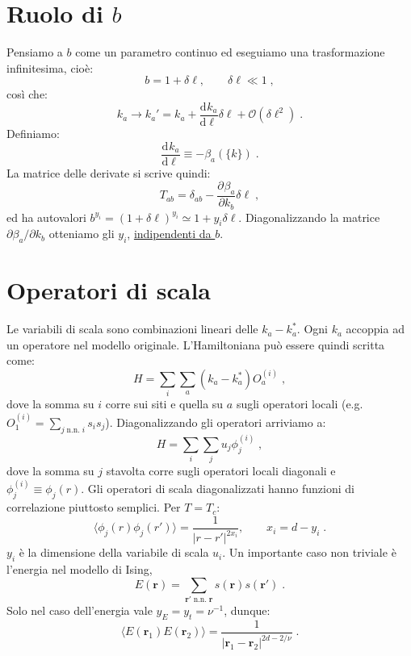 \documentclass[10pt,a4paper]{report}
\theoremstyle{definition}
\newcommand{\pdev}[3][]{\frac{\partial^{#1} #2}{\partial #3^{#1}}}
\newcommand{\dev}[3][]{\frac{\mathrm{d}^{#1} #2}{\mathrm{d} #3^{#1}}}
\numberwithin{equation}{section}
\newcommand{\bra}{\langle}
\newcommand{\ket}{\rangle}
\begin{document}
\section{Ruolo di $b$}
Pensiamo a $b$ come un parametro continuo ed eseguiamo una trasformazione infinitesima, cioè:
$$
b=1+\delta\ell,\qquad \delta\ell\ll 1\;,
$$
così che:
\begin{equation}
k_a\to k_a'=k_a+\dev{k_a}{\ell}\delta\ell+\mathcal{O}(\delta\ell^2)\;.
\end{equation}
Definiamo:
\begin{equation}
\dev{k_a}{\ell}\equiv -\beta_a(\{k\})\;.
\end{equation}
La matrice delle derivate si scrive quindi:
\begin{equation}
T_{ab}=\delta_{ab}-\pdev{\beta_a}{k_b}\delta\ell\;,
\end{equation}
ed ha autovalori $b^{y_i}=(1+\delta\ell)^{y_i}\simeq 1+y_i\delta\ell$. Diagonalizzando la matrice $\partial\beta_a/\partial k_b$ otteniamo gli $y_i$, \underline{indipendenti da $b$}.
\section{Operatori di scala}
Le variabili di scala sono combinazioni lineari delle $k_a-k_a^*$. Ogni $k_a$ accoppia ad un operatore nel modello originale. L'Hamiltoniana può essere quindi scritta come:
\begin{equation}
H=\sum_i\sum_a(k_a-k_a^*)O_a^{(i)}\;,
\end{equation}
dove la somma su $i$ corre sui siti e quella su $a$ sugli operatori locali (e.g. $O_1^{(i)}=\sum_{j \;\mathrm{n.n.}\;i}s_is_j$). Diagonalizzando gli operatori arriviamo a:
\begin{equation}
H=\sum_i\sum_ju_j\phi_j^{(i)}\;,
\end{equation}
dove la somma su $j$ stavolta corre sugli operatori locali diagonali e $\phi_j^{(i)}\equiv\phi_j(r)$. Gli operatori di scala diagonalizzati hanno funzioni di correlazione piuttosto semplici. Per $T=T_c$:
\begin{equation}
\bra \phi_j(r)\phi_j(r')\ket=\frac{1}{|r-r'|^{2x_i}},\qquad x_i=d-y_i\;.
\end{equation}
$y_i$ è la dimensione della variabile di scala $u_i$. Un importante caso non triviale è l'energia nel modello di Ising,
\begin{equation}
E(\mathbf{r})=\sum_{\mathbf{r}'\;\mathrm{n.n.}\;\mathbf{r}}s(\mathbf{r})s(\mathbf{r}')\;.
\end{equation}
Solo nel caso dell'energia vale $y_E=y_t=\nu^{-1}$, dunque:
\begin{equation}
\bra E(\mathbf{r}_1)E(\mathbf{r}_2)\ket=\frac{1}{|\mathbf{r}_1-\mathbf{r}_2|^{2d-2/\nu}}\;.
\end{equation}
\end{document}
